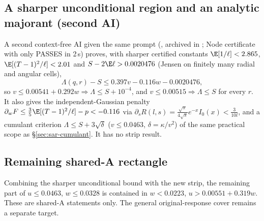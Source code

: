 \subsection{A sharper unconditional region and an analytic majorant (second AI)}\label{sec:sar-second}
A second context-free AI given the same prompt (, archived in
; Node certificate with only  PASSES in 2\,s) proves, with sharper certified constants
$\E[1/\ell]<2.865$, $\E[(T-1)^2/\ell]<2.01$ and $S-2\E\ell>0.0020476$ (Jensen on finitely many radial and angular cells),
\[
\boxed{\Lambda(q,r)-S\le0.397v-0.116w-0.0020476,}
\]
so $v\le0.00541+0.292w\Rightarrow\Lambda\le S+10^{-4}$, and $v\le0.00515\Rightarrow\Lambda\le S$ for every $r$. It also gives the independent-Gaussian penalty $\partial_wF\le\frac35\E[(T-1)^2/\ell]-p<-0.116$ via
$\partial_sR(l,s)=\frac{\sqrt\pi}{4\sqrt s}e^{-x}I_0(x)<\frac3{10l}$, and a cumulant criterion $\Lambda\le S+3\sqrt\delta$ ($v\le0.0463$, $\delta=\kappa/v^2$) of the same
practical scope as \S\ref{sec:sar-cumulant}. It has no strip result.



\subsection{Remaining shared-A rectangle}
Combining the sharper unconditional bound with the new strip, the remaining
part of $u\le0.0463$, $w\le0.0328$ is contained in
$w<0.0223$, $u>0.00551+0.319w$. These are shared-A statements only.
The general original-response cover remains a separate target.
